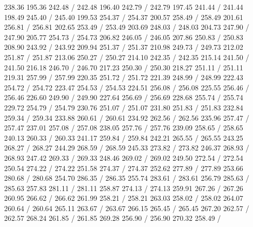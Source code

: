 { 238.36 195.36 242.48 /
 242.48 196.40 242.79 /
 242.79 197.45 241.44 /
 241.44 198.49 245.40 /
 245.40 199.53 254.37 /
 254.37 200.57 258.49 /
 258.49 201.61 256.81 /
 256.81 202.65 253.49 /
 253.49 203.69 248.03 /
 248.03 204.73 247.90 /
 247.90 205.77 254.73 /
 254.73 206.82 246.05 /
 246.05 207.86 250.83 /
 250.83 208.90 243.92 /
 243.92 209.94 251.37 /
 251.37 210.98 249.73 /
 249.73 212.02 251.87 /
 251.87 213.06 250.27 /
 250.27 214.10 242.35 /
 242.35 215.14 241.50 /
 241.50 216.18 246.70 /
 246.70 217.23 250.30 /
 250.30 218.27 251.11 /
 251.11 219.31 257.99 /
 257.99 220.35 251.72 /
 251.72 221.39 248.99 /
 248.99 222.43 254.72 /
 254.72 223.47 254.53 /
 254.53 224.51 256.08 /
 256.08 225.55 256.46 /
 256.46 226.60 249.90 /
 249.90 227.64 256.69 /
 256.69 228.68 255.74 /
 255.74 229.72 254.79 /
 254.79 230.76 251.07 /
 251.07 231.80 251.83 /
 251.83 232.84 259.34 /
 259.34 233.88 260.61 /
 260.61 234.92 262.56 /
 262.56 235.96 257.47 /
 257.47 237.01 257.08 /
 257.08 238.05 257.76 /
 257.76 239.09 258.65 /
 258.65 240.13 260.33 /
 260.33 241.17 259.84 /
 259.84 242.21 265.55 /
 265.55 243.25 268.27 /
 268.27 244.29 268.59 /
 268.59 245.33 273.82 /
 273.82 246.37 268.93 /
 268.93 247.42 269.33 /
 269.33 248.46 269.02 /
 269.02 249.50 272.54 /
 272.54 250.54 274.22 /
 274.22 251.58 274.37 /
 274.37 252.62 277.89 /
 277.89 253.66 280.68 /
 280.68 254.70 286.35 /
 286.35 255.74 283.61 /
 283.61 256.79 285.63 /
 285.63 257.83 281.11 /
 281.11 258.87 274.13 /
 274.13 259.91 267.26 /
 267.26 260.95 266.62 /
 266.62 261.99 258.21 /
 258.21 263.03 258.02 /
 258.02 264.07 260.64 /
 260.64 265.11 263.67 /
 263.67 266.15 265.45 /
 265.45 267.20 262.57 /
 262.57 268.24 261.85 /
 261.85 269.28 256.90 /
 256.90 270.32 258.49 /
}
